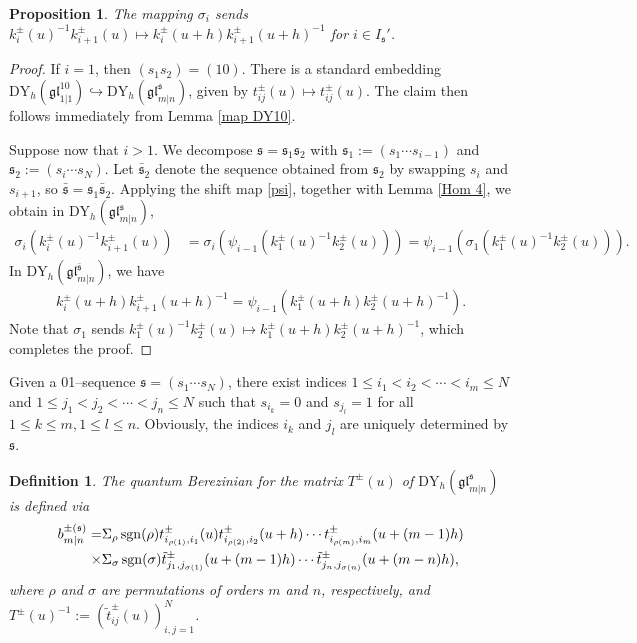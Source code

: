 \documentclass[a4paper,12pt]{article}
\newtheorem{defi}[theo]{Definition}
\newtheorem{prop}[theo]{Proposition}
\numberwithin{equation}{section}
\begin{document}
\begin{prop} \label{sigma}
The mapping $\sigma_i$ sends $k_{i}^{\pm }(u)^{-1}k_{i+1}^{\pm }(u)\mapsto k_{i}^{\pm}(u+h)k_{i+1}^{\pm}(u+h)^{-1}$ for $i\in I_{\mathfrak{s}}'$.
\end{prop}
\begin{proof}
If $i=1$, then $(s_1s_2)=(10)$. There is a standard embedding $\mathrm{DY}_{h}
(\mathfrak{gl}_{1|1}^{10})\hookrightarrow\mathrm{DY}_{h}(\mathfrak{gl}_{m|n}^{\mathfrak{s}})$, given by $t_{ij}^{\pm}(u)\mapsto t_{ij}^{\pm}(u)$. The claim then follows immediately from Lemma \ref{map DY10}.

Suppose now that $i>1$. We decompose $\mathfrak{s}=\mathfrak{s}_{1} \mathfrak{s}_{2}$ with $\mathfrak{s}_{1}:=(s_1\cdots s_{i-1})$ and $\mathfrak{s}_{2}:=(s_{i}\cdots s_{N})$. Let $\bar{\mathfrak{s}}_{2}$ 
  denote the sequence obtained from $\mathfrak{s}_{2}$ by swapping $s_{i}$ and $s_{i+1}$, so $\bar{\mathfrak{s}}=\mathfrak{s}_{1}\bar{\mathfrak{s}}_{2}$. Applying the shift map \eqref{psi}, together with Lemma \ref{Hom 4}, we obtain in $\mathrm{DY}_{h}(\mathfrak{gl}_{m|n}^{\mathfrak{s}})$,
\begin{align*}
\sigma_{i}\left(k_{i}^{\pm}(u)^{-1}k_{i+1}^{\pm }(u)\right)&=\sigma_{i}\left(\psi_{i-1}\left(k_{1}^{\pm }(u)^{-1}k_{2}^{\pm }(u)\right)\right)
=\psi_{i-1}\left(\sigma_{1}\left(k_{1}^{\pm }(u)^{-1}k_{2}^{\pm }(u)\right)\right).
\end{align*}
In $\mathrm{DY}_{h}(\mathfrak{gl}_{m|n}^{\bar{\mathfrak{s}}})$, we have
\begin{align*}
k_{i}^{\pm }(u+h)k_{i+1}^{\pm }(u+h)^{-1}=\psi_{i-1}\left(k_{1}^{\pm }(u+h)k_{2}^{\pm }(u+h)^{-1}\right).
\end{align*}
Note that $\sigma_{1}$ sends $k_{1}^{\pm }(u)^{-1}k_{2}^{\pm }(u)\mapsto k_{1}^{\pm}(u+h)k_{2}^{\pm}(u+h)^{-1}$, which completes the proof.
\end{proof}

Given a 01--sequence $\mathfrak{s}=(s_{1}\cdots s_{N})$, there exist indices $1\leq i_{1}< i_{2}<\cdots<i_{m}\leq N$ and $1\leq j_{1}< j_{2}<\cdots<j_{n}\leq N$ such that $s_{i_{k}}=0$ and $s_{j_{l}}=1$ for all $1\leq k\leq m, 1\leq l\leq n$. Obviously, the indices $i_k$ and $j_l$ are uniquely determined by $\mathfrak{s}$.

\begin{defi}\label{quantum berezinian}
The quantum Berezinian for the matrix $T^{\pm}(u)$ of $\mathrm{DY}_{h}(\mathfrak{gl}_{m|n}^{\mathfrak{s}})$ is defined via
\begin{align}\notag
b_{m|n}^{\pm (\mathfrak{s})}=&\Sigma_{\rho}\operatorname{sgn}(\rho)t_{i_{\rho(1)},i_{1}}^{\pm }(u)t_{i_{\rho(2)},i_{2}}^{\pm }(u+h)\cdots t_{i_{\rho(m)},i_{m}}^{\pm }(u+(m-1)h)\\ \label{berezinian 1}
\times &\Sigma_{\sigma}\operatorname{sgn}(\sigma){\tilde{t}_{j_{1},j_{\sigma(1)}}^{\pm }}(u+(m-1)h)\cdots {\tilde{t}_{j_{n},j_{\sigma(n)}}^{\pm }}(u+(m-n)h),
\end{align}
where $\rho$ and $\sigma$ are permutations of orders $m$ and $n$, respectively, and $T^{\pm}(u)^{-1}:=
\left(\tilde{t}_{ij}^{\pm}(u)\right)_{i,j=1}^{N}$. 
\end{defi}
\end{document}
